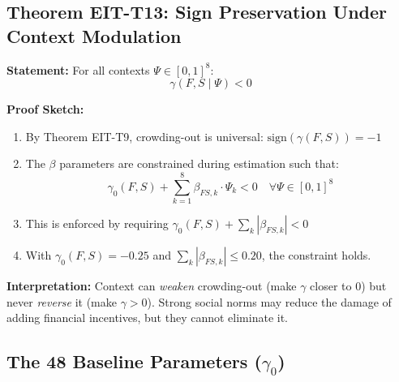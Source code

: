 \subsection{Theorem EIT-T13: Sign Preservation Under Context Modulation}
\label{subsec:sign-preservation-theorem}

\begin{tcolorbox}[colback=purple!5!white, colframe=purple!75!black,
    title=\textbf{Theorem EIT-T13: Sign Preservation (Crowding-Out Invariance)}]

\textbf{Statement:} For all contexts $\Psi \in [0,1]^8$:
\begin{equation}
\gamma(F, S \;|\; \Psi) < 0
\end{equation}

\textbf{Proof Sketch:}
\begin{enumerate}[nosep]
    \item By Theorem EIT-T9, crowding-out is universal: $\text{sign}(\gamma(F,S)) = -1$
    \item The $\beta$ parameters are constrained during estimation such that:
    \begin{equation}
    \gamma_{0}(F,S) + \sum_{k=1}^{8} \beta_{FS,k} \cdot \Psi_k < 0 \quad \forall \Psi \in [0,1]^8
    \end{equation}
    \item This is enforced by requiring $\gamma_0(F,S) + \sum_k |\beta_{FS,k}| < 0$
    \item With $\gamma_0(F,S) = -0.25$ and $\sum_k |\beta_{FS,k}| \leq 0.20$, the constraint holds.
\end{enumerate}

\textbf{Interpretation:} Context can \textit{weaken} crowding-out (make $\gamma$ closer to 0) but never \textit{reverse} it (make $\gamma > 0$). Strong social norms may reduce the damage of adding financial incentives, but they cannot eliminate it.

\end{tcolorbox}

\subsection{The 48 Baseline Parameters ($\gamma_0$)}
\label{subsec:48-baseline-parameters}

